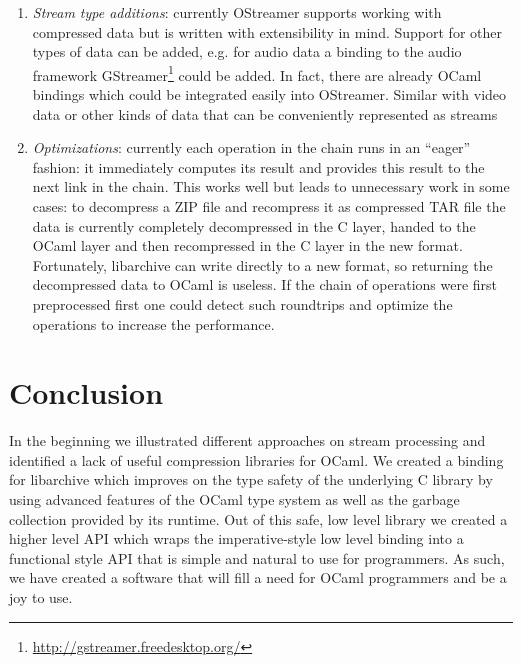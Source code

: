 \documentclass[parskip=half]{scrreprt}
\begin{document}
\begin{enumerate}
  \item \emph{Stream type additions}: currently OStreamer supports working with
    compressed data but is written with extensibility in mind. Support for
    other types of data can be added, e.g. for audio data a binding to the
    audio framework GStreamer\footnote{\url{http://gstreamer.freedesktop.org/}}
    could be added. In fact, there are already OCaml bindings which could be
    integrated easily into OStreamer. Similar with video data or other kinds of
    data that can be conveniently represented as streams
  \item \emph{Optimizations}: currently each operation in the chain runs in an
    \enquote{eager} fashion: it immediately computes its result and provides
    this result to the next link in the chain. This works well but leads to
    unnecessary work in some cases: to decompress a ZIP file and recompress it
    as compressed TAR file the data is currently completely decompressed in
    the C layer, handed to the OCaml layer and then recompressed in the C layer
    in the new format. Fortunately, libarchive can write directly to a new
    format, so returning the decompressed data to OCaml is useless.  If the
    chain of operations were first preprocessed first one could detect such
    roundtrips and optimize the operations to increase the performance.
\end{enumerate}

\section{Conclusion}
\label{sec:conclusion}


In the beginning we illustrated different approaches on stream processing and
identified a lack of useful compression libraries for OCaml. We created a
binding for libarchive which improves on the type safety of the underlying C
library by using advanced features of the OCaml type system as well as the
garbage collection provided by its runtime. Out of this safe, low level library
we created a higher level API which wraps the imperative-style low level
binding into a functional style API that is simple and natural to use for
programmers. As such, we have created a software that will fill a need for
OCaml programmers and be a joy to use.
\end{document}
